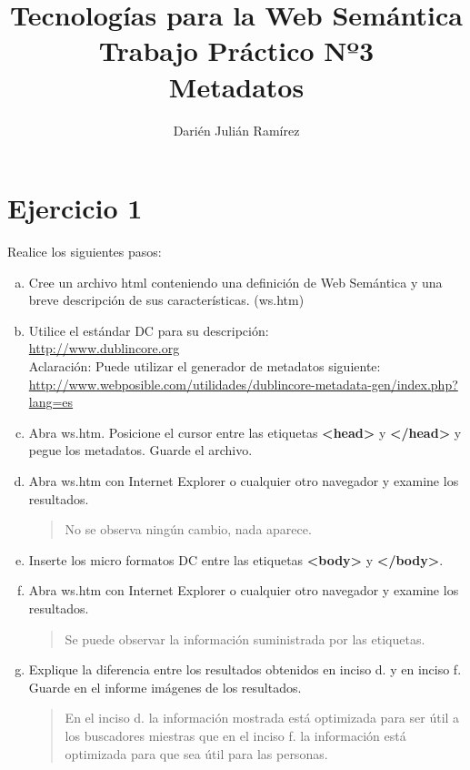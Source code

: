 \documentclass[a4paper,12pt,oneside,final,spanish]{article}
\title{\Huge Tecnologías para la Web Semántica\\
Trabajo Práctico Nº3\\
Metadatos}
\author{Darién Julián Ramírez}
\date{\vspace{-5ex}}
\begin{document}
\maketitle %

\section*{Ejercicio 1}

Realice los siguientes pasos:

\begin{enumerate}[a.]
\item Cree un archivo html conteniendo una definición de Web Semántica y una breve descripción de sus características. (ws.htm) 
\item Utilice el estándar DC para su descripción:\\
\url{http://www.dublincore.org}\\
Aclaración: Puede utilizar el generador de metadatos siguiente:\\
\url{http://www.webposible.com/utilidades/dublincore-metadata-gen/index.php?lang=es}
\item Abra ws.htm. Posicione el cursor entre las etiquetas \textbf{<head>} y \textbf{</head>} y pegue los metadatos. Guarde el archivo. 
\item Abra ws.htm con Internet Explorer o cualquier otro navegador y examine los resultados.

\begin{quote}
No se observa ningún cambio, nada aparece.
\end{quote}

\item Inserte los micro formatos DC entre las etiquetas \textbf{<body>} y \textbf{</body>}.
\item Abra ws.htm con Internet Explorer o cualquier otro navegador y examine los resultados.

\begin{quote}
Se puede observar la información suministrada por las etiquetas.
\end{quote}

\item Explique la diferencia entre los resultados obtenidos en inciso d. y en inciso f. Guarde en el informe imágenes de los resultados.  

\begin{quote}
En el inciso d. la información mostrada está optimizada para ser útil a los buscadores miestras que en el inciso f. la información está optimizada para que sea útil para las personas.
\end{quote}


\end{enumerate}
\end{document}
